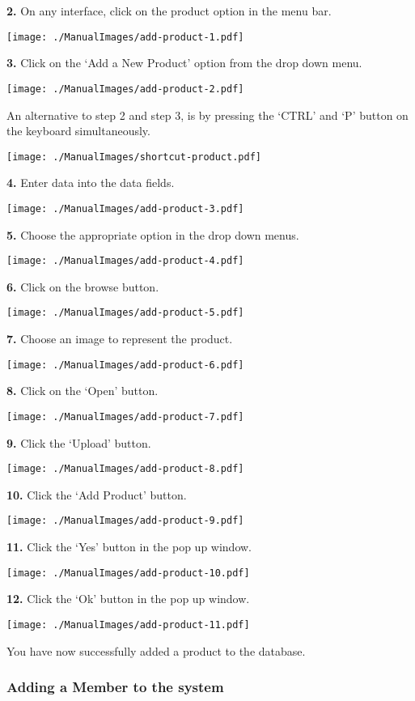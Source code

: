 \textbf{2.} On any interface, click on the product option in the menu bar.

\texttt{[image: ./ManualImages/add-product-1.pdf]}

\textbf{3.} Click on the `Add a New Product' option from the drop down menu.

\texttt{[image: ./ManualImages/add-product-2.pdf]}

An alternative to step 2 and step 3, is by pressing the `CTRL' and `P' button on the keyboard simultaneously.

\texttt{[image: ./ManualImages/shortcut-product.pdf]}

\textbf{4. }Enter data into the data fields.

\texttt{[image: ./ManualImages/add-product-3.pdf]}

\textbf{5.} Choose the appropriate option in the drop down menus.

\texttt{[image: ./ManualImages/add-product-4.pdf]}

\textbf{6.} Click on the browse button.

\texttt{[image: ./ManualImages/add-product-5.pdf]}

\textbf{7.} Choose an image to represent the product.

\texttt{[image: ./ManualImages/add-product-6.pdf]}

\textbf{8.} Click on the `Open' button.

\texttt{[image: ./ManualImages/add-product-7.pdf]}

\textbf{9.} Click the `Upload' button.

\texttt{[image: ./ManualImages/add-product-8.pdf]}

\textbf{10.} Click the `Add Product' button.

\texttt{[image: ./ManualImages/add-product-9.pdf]}

\textbf{11.} Click the `Yes' button in the pop up window.

\texttt{[image: ./ManualImages/add-product-10.pdf]}

\textbf{12.} Click the `Ok' button in the pop up window.

\texttt{[image: ./ManualImages/add-product-11.pdf]}

You have now successfully added a product to the database.

\pagebreak
\subsubsection{Adding a Member to the system}
\label{fig:Adding a Member to the system}

